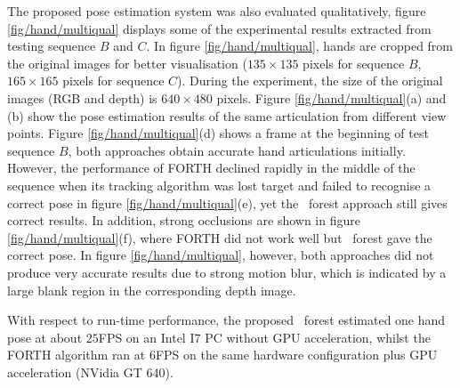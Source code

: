 The proposed pose estimation system was also evaluated qualitatively, figure \ref{fig/hand/multiqual} displays some of the experimental results extracted from testing sequence $B$ and $C$.
In figure \ref{fig/hand/multiqual}, hands are cropped from the original images for better visualisation ($135\times135$ pixels for sequence $B$, $165\times165$ pixels for sequence $C$). During the experiment, the size of the original images (RGB and depth) is $640\times480$ pixels.
Figure \ref{fig/hand/multiqual}(a) and (b) show the pose estimation results of the same articulation from different view points.  
Figure \ref{fig/hand/multiqual}(d) shows a frame at the beginning of test sequence $B$, both approaches obtain accurate hand articulations initially. However, the performance of FORTH declined rapidly in the middle of the sequence when its tracking algorithm was lost target and failed to recognise a correct pose in figure \ref{fig/hand/multiqual}(e), yet the \STR\ forest approach still gives correct results. In addition, strong occlusions are shown in figure \ref{fig/hand/multiqual}(f), where FORTH did not work well but \STR\ forest gave the correct pose. In figure \ref{fig/hand/multiqual}, however, both approaches did not produce very accurate results due to strong motion blur, which is indicated by a large blank region in the corresponding depth image.   

With respect to run-time performance, the proposed \STR\ forest estimated one hand pose at about $25$FPS on an Intel I7 PC without GPU acceleration, whilst the FORTH algorithm ran at $6$FPS on the same hardware configuration plus GPU acceleration (NVidia GT 640). 


 

